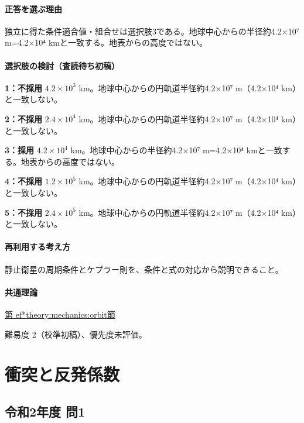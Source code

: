 \paragraph{正答を選ぶ理由} 独立に得た条件適合値・組合せは選択肢3である。地球中心からの半径約4.2×10⁷ m=4.2×10⁴ kmと一致する。地表からの高度ではない。

\paragraph{選択肢の検討（査読待ち初稿）}

\noindent\textbf{1：不採用} \(4.2\times10^3\) km。地球中心からの円軌道半径約4.2×10⁷ m（4.2×10⁴ km）と一致しない。\par

\noindent\textbf{2：不採用} \(2.4\times10^4\) km。地球中心からの円軌道半径約4.2×10⁷ m（4.2×10⁴ km）と一致しない。\par

\noindent\textbf{3：採用} \(4.2\times10^4\) km。地球中心からの半径約4.2×10⁷ m=4.2×10⁴ kmと一致する。地表からの高度ではない。\par

\noindent\textbf{4：不採用} \(1.2\times10^5\) km。地球中心からの円軌道半径約4.2×10⁷ m（4.2×10⁴ km）と一致しない。\par

\noindent\textbf{5：不採用} \(2.4\times10^5\) km。地球中心からの円軌道半径約4.2×10⁷ m（4.2×10⁴ km）と一致しない。\par

\paragraph{再利用する考え方} 静止衛星の周期条件とケプラー則を、条件と式の対応から説明できること。

\paragraph{共通理論} \hyperref[theory:mechanics:orbit]{第
ef*{theory:mechanics:orbit}節}

\par 難易度 2（校準初稿）、優先度未評価。

\section{衝突と反発係数}

\subsection{令和2年度 問1}
\label{q:r02-reg-applied-01}

